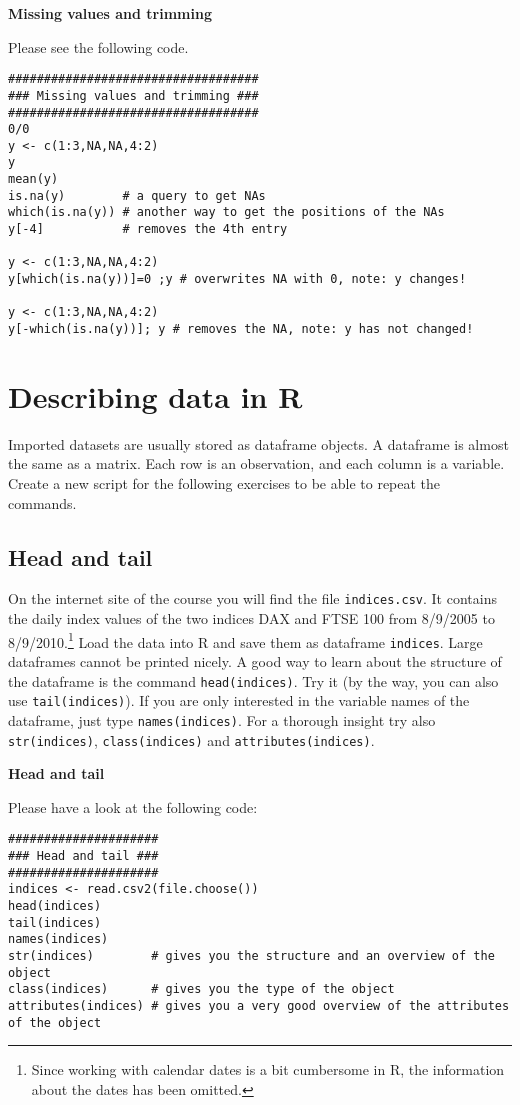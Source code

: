 \documentclass{article}
\begin{document}
\begin{solution}
\textbf{Missing values and trimming}

Please see the following code.
\begin{verbatim}
###################################
### Missing values and trimming ###
###################################
0/0
y <- c(1:3,NA,NA,4:2)
y
mean(y)
is.na(y)        # a query to get NAs
which(is.na(y)) # another way to get the positions of the NAs
y[-4]           # removes the 4th entry

y <- c(1:3,NA,NA,4:2)
y[which(is.na(y))]=0 ;y # overwrites NA with 0, note: y changes!

y <- c(1:3,NA,NA,4:2)
y[-which(is.na(y))]; y # removes the NA, note: y has not changed!
\end{verbatim}
\end{solution}

\section{Describing data in R\label{beschreiben}}

Imported datasets are usually stored as dataframe objects. A dataframe is almost the same as a matrix. Each row is an observation, and each column is a variable. Create a new script for the following exercises to be able to repeat the commands.

\subsection{Head and tail\label{indices}}

On the internet site of the course you will find the file \texttt{indices.csv}. It contains the daily index values of the two indices DAX and FTSE 100 from 8/9/2005 to 8/9/2010.\footnote{Since working with calendar dates is a bit cumbersome in R, the information about the dates has been omitted.} Load the data into R and save them as dataframe \texttt{indices}. Large dataframes cannot be printed nicely. A good way to learn about the structure of the dataframe is the command \texttt{head(indices)}. Try it (by the way, you can also use \texttt{tail(indices)}). If you are only interested in the variable names of the dataframe, just type \texttt{names(indices)}. For a thorough insight try also \texttt{str(indices)}, \texttt{class(indices)} and \texttt{attributes(indices)}.

\begin{solution}
\textbf{Head and tail}

Please have a look at the following code:
\begin{verbatim}
#####################
### Head and tail ###
#####################
indices <- read.csv2(file.choose())
head(indices)
tail(indices)
names(indices)
str(indices)        # gives you the structure and an overview of the object
class(indices)      # gives you the type of the object
attributes(indices) # gives you a very good overview of the attributes of the object
\end{verbatim}
\end{solution}
\end{document}
